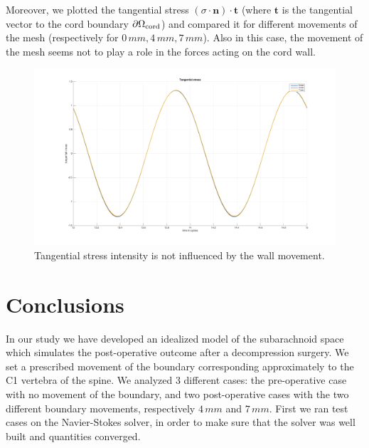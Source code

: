 \documentclass[a4paper,11pt,openright,twoside]{book}
\begin{document}
Moreover, we plotted the tangential stress $(\sigma \cdot \mathbf{n}) \cdot \mathbf{t}$ (where $\mathbf{t}$ is the tangential vector to the cord boundary $\partial \Omega_{\rm cord}$) and compared it for different movements of the mesh (respectively for $0 \, mm, 4 \, mm, 7 \, mm$). Also in this case, the movement of the mesh seems not to play a role in the forces acting on the cord wall.

\begin{figure}[h!]
\centering
\includegraphics[width=\textwidth]{images/tangential_stress.png}
\caption{Tangential stress intensity is not influenced by the wall movement.}
\end{figure}





\chapter{Conclusions}

In our study we have developed an idealized model of the subarachnoid space which simulates the post-operative outcome after a decompression surgery. We set a prescribed movement of the boundary corresponding approximately to the C1 vertebra of the spine. We analyzed 3 different cases: the pre-operative case with no movement of the boundary, and two post-operative cases with the two different boundary movements, respectively $4 \, mm$ and $7 \, mm$.
First we ran test cases on the Navier-Stokes solver, in order to make sure that the solver was well built and quantities converged. \\
\end{document}
